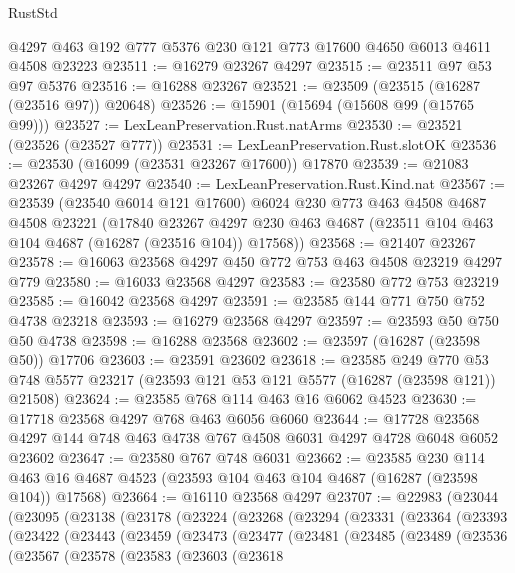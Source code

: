 \begin{lexlean}{RustStd}
\begin{coremodule}
    @4297
    @463
    @192
    @777
    @5376
    @230
    @121
    @773
    @17600
    @4650
    @6013
    @4611
    @4508
    @23223
@23511 := @16279 @23267 @4297
@23515 := @23511 @97 @53 @97 @5376
@23516 := @16288 @23267
@23521 := @23509 (@23515 (@16287 (@23516 @97)) @20648)
@23526 := @15901 (@15694 (@15608 @99 (@15765 @99)))
@23527 := LexLeanPreservation.Rust.natArms
@23530 := @23521 (@23526 (@23527 @777))
@23531 := LexLeanPreservation.Rust.slotOK
@23536 := @23530 (@16099 (@23531 @23267 @17600)) @17870
@23539 := @21083 @23267 @4297 @4297
@23540 := LexLeanPreservation.Rust.Kind.nat
@23567 := @23539
    (@23540 @6014 @121 @17600)
    @6024
    @230
    @773
    @463
    @4508
    @4687
    @4508
    @23221
    (@17840
      @23267
      @4297
      @230
      @463
      @4687
      (@23511 @104 @463 @104 @4687 (@16287 (@23516 @104)) @17568))
@23568 := @21407 @23267
@23578 := @16063 @23568 @4297 @450 @772 @753 @463 @4508 @23219 @4297 @779
@23580 := @16033 @23568 @4297
@23583 := @23580 @772 @753 @23219
@23585 := @16042 @23568 @4297
@23591 := @23585 @144 @771 @750 @752 @4738 @23218
@23593 := @16279 @23568 @4297
@23597 := @23593 @50 @750 @50 @4738
@23598 := @16288 @23568
@23602 := @23597 (@16287 (@23598 @50)) @17706
@23603 := @23591 @23602
@23618 := @23585
    @249
    @770
    @53
    @748
    @5577
    @23217
    (@23593 @121 @53 @121 @5577 (@16287 (@23598 @121)) @21508)
@23624 := @23585 @768 @114 @463 @16 @6062 @4523
@23630 := @17718 @23568 @4297 @768 @463 @6056 @6060
@23644 := @17728 @23568 @4297 @144 @748 @463 @4738 @767 @4508 @6031 @4297 @4728 @6048 @6052 @23602
@23647 := @23580 @767 @748 @6031
@23662 := @23585
    @230
    @114
    @463
    @16
    @4687
    @4523
    (@23593 @104 @463 @104 @4687 (@16287 (@23598 @104)) @17568)
@23664 := @16110 @23568 @4297
@23707 := @22983
    (@23044
      (@23095
        (@23138
          (@23178
            (@23224
              (@23268
                (@23294
                  (@23331
                    (@23364
                      (@23393
                        (@23422
                          (@23443
                            (@23459
                              (@23473
                                (@23477
                                  (@23481
                                    (@23485
                                      (@23489
                                        (@23536
                                          (@23567
                                            (@23578
                                              (@23583
                                                (@23603
                                                  (@23618

\end{coremodule}
\end{lexlean}
